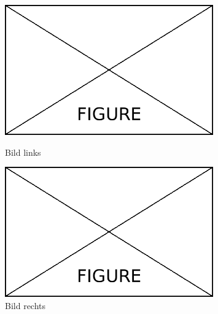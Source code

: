 \bigskip
\begin{figure}[!h]
	\centering
	\begin{minipage}{0.5\textwidth}
		\centering
		\includegraphics[width=0.8\textwidth]{Content/Figures/figure.png}
		\caption{Bild links}
		\label{fig:testa}
	\end{minipage}%
	\begin{minipage}{0.5\textwidth}
		\centering
		\includegraphics[width=0.8\textwidth]{Content/Figures/figure.png}
		\caption{Bild rechts}
		\label{fig:testb}
	\end{minipage}
\end{figure}




